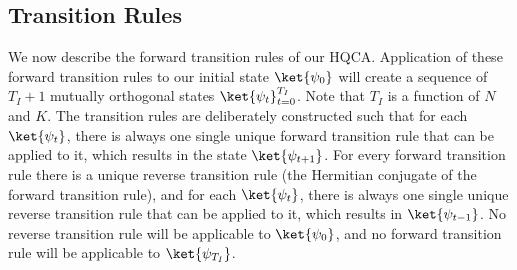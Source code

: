 \documentclass[11pt,letterpaper]{article}
\newcommand{\<}{\langle}
\renewcommand{\>}{\rangle}
\begin{document}
\subsection{Transition Rules}

We now describe the forward transition rules of our HQCA. Application of these forward transition rules to our initial state $\ket{\psi_0}$ will create a sequence of $T_I+1$ mutually orthogonal states $\ket{\psi_t}_{t=0}^{T_I}$. Note that $T_I$ is a function of $N$ and $K$. The transition rules are deliberately constructed such that for each $\ket{\psi_t}$, there is always one single unique forward transition rule that can be applied to it, which results in the state $\ket{\psi_{t+1}}$. For every forward transition rule there is a unique reverse transition rule (the Hermitian conjugate of the forward transition rule), and for each $\ket{\psi_t}$, there is always one single unique reverse transition rule that can be applied to it, which results in $\ket{\psi_{t-1}}$. No reverse transition rule will be applicable to $\ket{\psi_0}$, and no forward transition rule will be applicable to $\ket{\psi_{T_I}}$.
\end{document}
